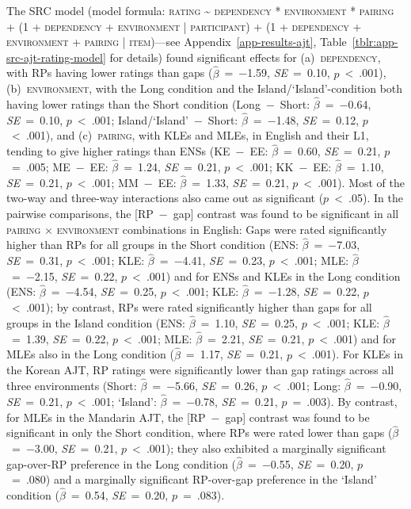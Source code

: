 The SRC model (model formula: \textsc{rating \~{} dependency * environment * pairing + (1 + dependency + environment | participant) + (1 + dependency + environment + pairing | item)}---see Appendix~\ref{app-results-ajt}, Table~\ref{tblr:app-src-ajt-rating-model} for details) found significant effects for (a)~\textsc{dependency}, with RPs having lower ratings than gaps ($\hat{\beta}$~=~−1.59, \textit{SE}~=~0.10, $p$~<~.001), (b)~\textsc{environment}, with the Long condition and the Island/`Island'-condition both having lower ratings than the Short condition (Long~−~Short: $\hat{\beta}$~=~−0.64, \textit{SE}~=~0.10, $p$~<~.001; Island/`Island'~−~Short: $\hat{\beta}$~=~−1.48, \textit{SE}~=~0.12, $p$~<~.001), and (c)~\textsc{pairing}, with KLEs and MLEs, in English and their L1, tending to give higher ratings than ENSs (KE~−~EE: $\hat{\beta}$~=~0.60, \textit{SE}~=~0.21, $p$~=~.005; ME~−~EE: $\hat{\beta}$~=~1.24, \textit{SE}~=~0.21, $p$~<~.001; KK~−~EE: $\hat{\beta}$~=~1.10, \textit{SE}~=~0.21, $p$~<~.001; MM~−~EE: $\hat{\beta}$~=~1.33, \textit{SE}~=~0.21, $p$~<~.001). Most of the two-way and three-way interactions also came out as significant ($p$~<~.05). In the pairwise comparisons, the [RP~−~gap] contrast was found to be significant in all \textsc{pairing} × \textsc{environment} combinations in English: Gaps were rated significantly higher than RPs for all groups in the Short condition (ENS: $\hat{\beta}$~=~−7.03, \textit{SE}~=~0.31, $p$~<~.001; KLE: $\hat{\beta}$~=~−4.41, \textit{SE}~=~0.23, $p$~<~.001; MLE: $\hat{\beta}$~=~−2.15, \textit{SE}~=~0.22, $p$~<~.001) and for ENSs and KLEs in the Long condition (ENS: $\hat{\beta}$~=~−4.54, \textit{SE}~=~0.25, $p$~<~.001; KLE: $\hat{\beta}$~=~−1.28, \textit{SE}~=~0.22, $p$~<~.001); by contrast, RPs were rated significantly higher than gaps for all groups in the Island condition (ENS: $\hat{\beta}$~=~1.10, \textit{SE}~=~0.25, $p$~<~.001; KLE: $\hat{\beta}$~=~1.39, \textit{SE}~=~0.22, $p$~<~.001; MLE: $\hat{\beta}$~=~2.21, \textit{SE}~=~0.21, $p$~<~.001) and for MLEs also in the Long condition ($\hat{\beta}$~=~1.17, \textit{SE}~=~0.21, $p$~<~.001). For KLEs in the Korean AJT, RP ratings were significantly lower than gap ratings across all three environments (Short: $\hat{\beta}$~=~−5.66, \textit{SE}~=~0.26, $p$~<~.001; Long: $\hat{\beta}$~=~−0.90, \textit{SE}~=~0.21, $p$~<~.001; `Island': $\hat{\beta}$~=~−0.78, \textit{SE}~=~0.21, $p$~=~.003). By contrast, for MLEs in the Mandarin AJT, the [RP~−~gap] contrast was found to be significant in only the Short condition, where RPs were rated lower than gaps ($\hat{\beta}$~=~−3.00, \textit{SE}~=~0.21, $p$~<~.001); they also exhibited a marginally significant gap-over-RP preference in the Long condition ($\hat{\beta}$~=~−0.55, \textit{SE}~=~0.20, $p$~=~.080) and a marginally significant RP-over-gap preference in the `Island' condition ($\hat{\beta}$~=~0.54, \textit{SE}~=~0.20, $p$~=~.083).

